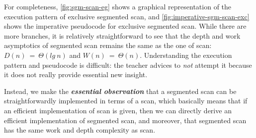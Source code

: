 \documentclass[acmsmall,review]{acmart}\settopmatter{printfolios=true,printccs=false,printacmref=false}
\begin{document}
For completeness, \cref{fig:sgm-scan-eg} shows a graphical representation
of the execution pattern of exclusive segmented scan, and 
\cref{fig:imperative-sgm-scan-exc} shows the imperative pseudocode for
exclusive segmented scan. While there are more branches, it is relatively
straightforward to see that the depth and work asymptotics of segmented
scan remains the same as the one of scan: $D(n) ~=~ \Theta(lg~n)$ and
$W(n) ~=~ \Theta(n)$.   Understanding the execution pattern and pseudocode
is difficult: the teacher advices to {\em not} attempt it because
it does not really provide essential new insight. 

Instead, we make the \textbf{\em essential observation} that a segmented 
scan can be straightforwardly implemented in terms of a scan, which basically 
means that if an efficient implementation of scan is given, then we can 
directly derive an efficient implementation of segmented scan, and moreover,
that segmented scan has the same work and depth complexity as scan.
\end{document}
